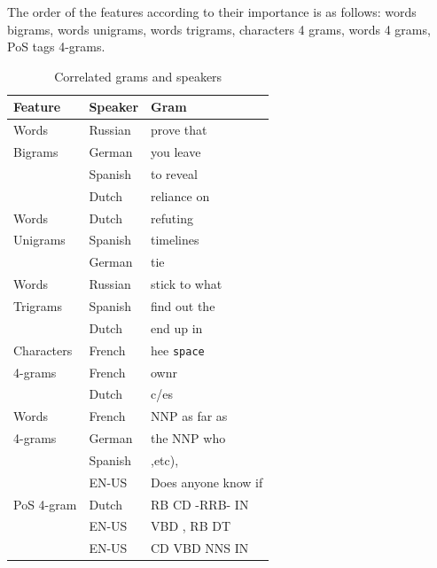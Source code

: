 \documentclass[11pt]{article}
\begin{document}
The order of the features according to their importance is as follows: words bigrams, words unigrams, words trigrams, characters 4 grams, words 4 grams, PoS tags 4-grams.


\begin{table}[htp]
\begin{tabular}{l|ll}
	Feature & Speaker  & Gram
	\\\hline
	Words & Russian &prove that\\
	 Bigrams& German& you leave\\
	 & Spanish& to reveal\\
	 & Dutch & reliance on\\\hline
	 
	Words &Dutch& refuting\\
	   Unigrams&Spanish&timelines\\
	    &German& tie\\\hline
	    
	Words 	&Russian& stick to what\\
	Trigrams&Spanish& find out the\\
	&Dutch& end up in\\\hline

	Characters &French& hee \verb+space+\\
	4-grams	&French&ownr\\
		&Dutch&c/es\\
	\hline

	Words &French& NNP as far as\\
	4-grams &German& the NNP who\\
	&Spanish& ,etc),\\
	&EN-US& Does anyone know if\\\hline
	
	PoS 4-gram &Dutch& RB CD -RRB- IN \\
	&EN-US& VBD , RB DT\\
	&EN-US& CD VBD NNS IN\\
	
\end{tabular}
\label{table:nonnative}
\caption{Correlated grams and speakers}
\end{table}
\end{document}
